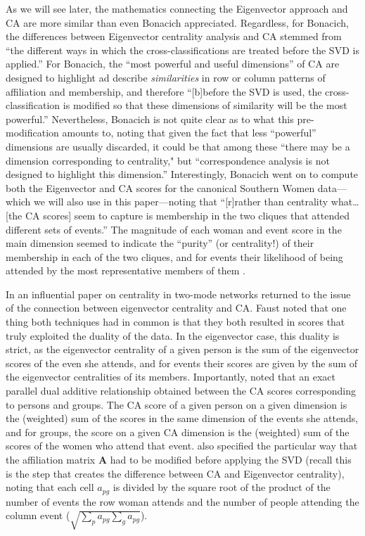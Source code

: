 \documentclass[a4paper,fleqn]{cas-sc}
\begin{document}
As we will see later, the mathematics connecting the Eigenvector approach and CA are more similar than even Bonacich appreciated. Regardless, for Bonacich, the differences between Eigenvector centrality analysis and CA stemmed from ``the different ways in which the cross-classifications are treated before the SVD is applied.'' For Bonacich, the ``most powerful and useful dimensions'' of CA are designed to highlight ad describe \textit{similarities} in row or column patterns of affiliation and membership, and therefore ``[b]before the SVD is used, the cross-classification is modified so that these dimensions of similarity will be the most powerful.'' Nevertheless, Bonacich is not quite clear as to what this pre-modification amounts to, noting that given the fact that less ``powerful'' dimensions are usually discarded, it could be that among these ``there may be a dimension corresponding to centrality," but ``correspondence analysis is not designed to highlight this dimension.'' Interestingly, Bonacich went on to compute both the Eigenvector and CA scores for the canonical Southern Women data---which we will also use in this paper---noting that ``[r]rather than centrality what\ldots[the CA scores] seem to capture is membership in the two cliques that attended different sets of events.'' The magnitude of each woman and event score in the main dimension seemed to indicate the ``purity'' (or centrality!) of their membership in each of the two cliques, and for events their likelihood of being attended by the most representative members of them 
\citep[164]{bonacich1991simultaneous}. 

In an influential paper on centrality in two-mode networks \citet{faust1997centrality} returned to the issue of the connection between eigenvector centrality and CA. Faust noted that one thing both techniques had in common is that they both resulted in scores that truly exploited the duality of the data. In the eigenvector case, this duality is strict, as the eigenvector centrality of a given person is the sum of the eigenvector scores of the even she attends, and for events their scores are given by the sum of the eigenvector centralities of its members. Importantly, \citet{faust1997centrality} noted that an exact parallel dual additive relationship obtained between the CA scores corresponding to persons and groups. The CA score of a given person on a given dimension is the (weighted) sum of the scores in the same dimension of the events she attends, and for groups, the score on a given CA dimension is the (weighted) sum of the scores of the women who attend that event. \citet{faust1997centrality} also specified the particular way that the affiliation matrix $\mathbf{A}$ had to be modified before applying the SVD (recall this is the step that creates the difference between CA and Eigenvector centrality), noting that each cell $a_{pg}$ is divided by the square root of the product of the number of events the row woman attends and the number of people attending the column event ($\sqrt{\sum_p a_{pg}\sum_g a_{pg}}$).
\end{document}
